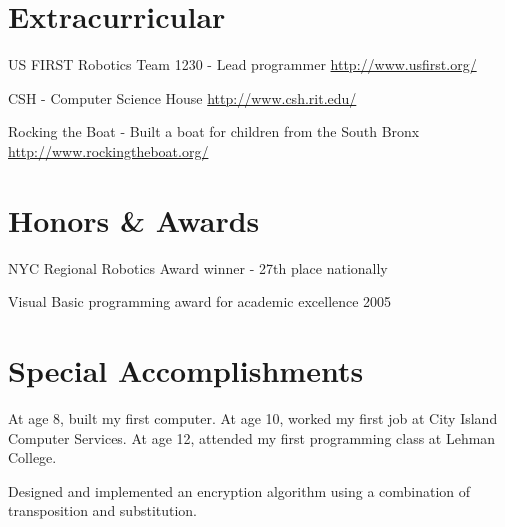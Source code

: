 \documentclass[a4paper,margin,line]{resume}
\newcommand{\rurl}[1]{\hfill {\footnotesize \url{#1}}}
\begin{document}
\begin{resume}
\section{\mysidestyle Extracurricular}
	\begin{asparablank}
		\item US FIRST Robotics Team 1230 - {\small Lead programmer} \rurl{http://www.usfirst.org/}
		\item CSH - {\small Computer Science House} \rurl{http://www.csh.rit.edu/}
		\item Rocking the Boat - {\small Built a boat for children from the South
		Bronx} \rurl{http://www.rockingtheboat.org/}
	\end{asparablank}

\section{\mysidestyle Honors \& Awards}
	\begin{asparablank}
		\item NYC Regional Robotics Award winner - {\small 27th place nationally}
		\item Visual Basic programming award for academic excellence 2005
	\end{asparablank}

\section{\mysidestyle Special Accomplishments}
	\begin{asparablank}
		\item At age 8, built my first computer. At age 10, worked my first job at
		City Island Computer Services. At age 12, attended my first programming
		class at Lehman College.
		\item Designed and implemented an encryption algorithm using a
		combination of transposition and substitution.
	\end{asparablank}

\end{resume}
\pagebreak[4] %

\end{document}
